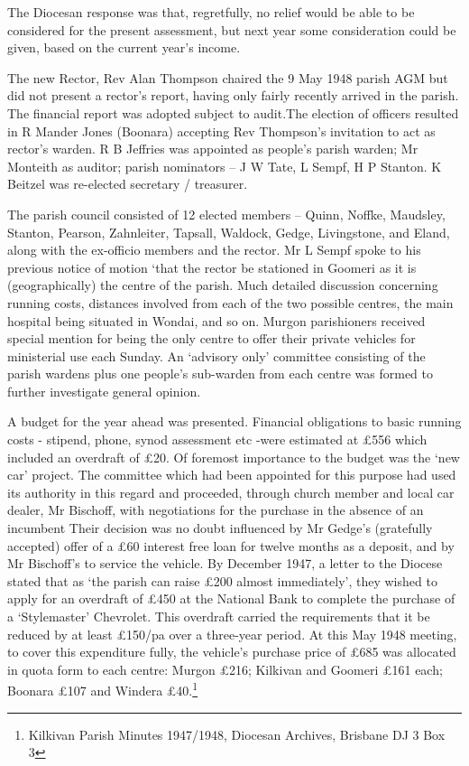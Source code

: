The Diocesan response was that, regretfully, no relief would be able to be considered for the present assessment, but next year some consideration could be given, based on the current year's income.



The new Rector, Rev Alan Thompson chaired the 9 May 1948 parish AGM but did not present a rector's report, having only fairly recently arrived in the parish. The financial report was adopted subject to audit.The election of officers resulted in R Mander Jones (Boonara) accepting Rev Thompson's invitation to act as rector's warden. R B Jeffries was appointed as people's parish warden; Mr Monteith as auditor; parish nominators -- J W Tate, L Sempf, H P Stanton. K Beitzel was re-elected secretary / treasurer.



The parish council consisted of 12 elected members -- Quinn, Noffke, Maudsley, Stanton, Pearson, Zahnleiter, Tapsall, Waldock, Gedge, Livingstone, and Eland, along with the ex-officio members and the rector. Mr L Sempf spoke to his previous notice of motion `that the rector be stationed in Goomeri as it is (geographically) the centre of the parish. Much detailed discussion concerning running costs, distances involved from each of the two possible centres, the main hospital being situated in Wondai, and so on. Murgon parishioners received special mention for being the only centre to offer their private vehicles for ministerial use each Sunday. An `advisory only' committee consisting of the parish wardens plus one people's sub-warden from each centre was formed to further investigate general opinion.



A budget for the year ahead was presented. Financial obligations to basic running costs - stipend, phone, synod assessment etc -were estimated at \pounds556 which included an overdraft of \pounds20. Of foremost importance to the budget was the `new car' project. The committee which had been appointed for this purpose had used its authority in this regard and proceeded, through church member and local car dealer, Mr Bischoff, with negotiations for the purchase in the absence of an incumbent Their decision was no doubt influenced by Mr Gedge's (gratefully accepted) offer of a \pounds60 interest free loan for twelve months as a deposit, and by Mr Bischoff's to service the vehicle. By December 1947, a letter to the Diocese stated that as `the parish can raise \pounds200 almost immediately', they wished to apply for an overdraft of \pounds450 at the National Bank to complete the purchase of a `Stylemaster' Chevrolet. This overdraft carried the requirements that it be reduced by at least \pounds150/pa over a three-year period. At this May 1948 meeting, to cover this expenditure fully, the vehicle's purchase price of \pounds685 was allocated in quota form to each centre: Murgon \pounds216; Kilkivan and Goomeri \pounds161 each; Boonara \pounds107 and Windera \pounds40.\footnote{Kilkivan Parish Minutes 1947/1948, Diocesan Archives, Brisbane DJ 3 Box 3}


